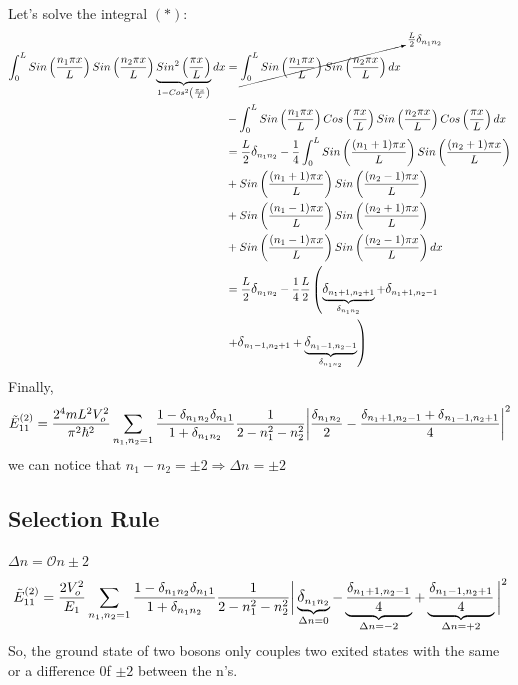 \documentclass[12pt,fancychapters]{report}
\numberwithin{equation}{section}
\begin{document}
Let's solve the integral $(*)$:
\begin{align*}
\int_{0}^{L} Sin\left(\frac{n_1 \pi x}{L}\right)
	Sin\left(\frac{n_2 \pi x}{L}\right)\underbrace{Sin^2\left(\frac{\pi x}{L}\right)}
	_{1-Cos^2\left(\frac{\pi x}{L}\right)}dx &= \cancelto{\frac{L}{2}\delta_{n_1n_2}}{\int_{0}^{L}
	Sin\left(\frac{n_1 \pi x}{L}\right)Sin\left(\frac{n_2 \pi x}{L}\right)dx}\\
	& -\int_{0}^{L}Sin\left(\frac{n_1 \pi x}{L}\right) Cos\left(\frac{\pi x}{L}\right)
	Sin\left(\frac{n_2 \pi x}{L}\right) Cos\left(\frac{\pi x}{L}\right)dx\\
	&= \frac{L}{2}\mathlarger{\delta}_{n_1n_2} -\frac{1}{4}\int_{0}^{L}Sin\left(\frac{(n_1+1)\pi x}
	{L}\right)Sin\left(\frac{(n_2+1)\pi x}{L}\right)\\
	& +Sin\left(\frac{(n_1+1)\pi x}{L}\right)Sin\left(\frac{(n_2-1)\pi x}{L}\right)\\
	&+ Sin\left(\frac{(n_1 -1)\pi x}{L}\right)Sin\left(\frac{(n_2+1)\pi x}{L}\right)\\
	&+ Sin\left(\frac{(n_1-1)\pi x}{L}\right)Sin\left(\frac{(n_2-1)\pi x}{L}\right)dx\\
	&= \frac{L}{2}\mathlarger{\delta}_{n_1n_2}-\frac{1}{4}\frac{L}{2}\left(\underbrace{\mathlarger
	{\delta}_{n_1+1,n_2+1}}_{\delta_{n_1n_2}} + \mathlarger{\delta}_{n_1+1,n_2-1}\right.\\
  & \left.+\mathlarger{\delta}
_{n_1-1,n_2+1}+\underbrace{\mathlarger{\delta}_{n_1-1,n_2-1}}_{\delta_{n_1n_2}}\right)\\
\end{align*}
Finally,
\begin{equation*}
	\tilde{E}_{11}^{(2)}=\frac{2^4 mL^2 V_o^2}{\pi^2 \hbar^2} \sum_{n_1,n_2 =1}\frac{1-\mathlarger{\delta}_{n_1 n_2}
	\mathlarger{\delta}_{n_1 1}}{1+\mathlarger{\delta}_{n_1 n_2}}\frac{1}{2-n_1^2-n_2^2}\bigg|
	\frac{\mathlarger{\delta}_{n_1n_2}}{2}-\frac{\mathlarger{\delta}_{n_1+1,n_2-1}+\mathlarger{\delta}
	_{n_1-1,n_2+1}}{4}\bigg|^2
\end{equation*}
we can notice that $n_1-n_2 = \pm 2\Rightarrow \Delta n = \pm 2$

\subsection*{Selection Rule}
$\Delta n = \mathcal{O}n \pm 2$
\begin{equation*}
		\tilde{E}_{11}^{(2)}=\frac{2V_o^2}{E_1} \sum_{n_1,n_2 =1}\frac{1-\mathlarger{\delta}_{n_1 n_2}
	\mathlarger{\delta}_{n_1 1}}{1+\mathlarger{\delta}_{n_1 n_2}}\frac{1}{2-n_1^2-n_2^2}\bigg|
	\underbrace{\mathlarger{\delta}_{n_1n_2}}_{\Delta n = 0}-
	\underbrace{\frac{\mathlarger{\delta}_{n_1+1,n_2-1}}{4}}_{\Delta n = -2}+
	\underbrace{\frac{\mathlarger{\delta}_{n_1-1,n_2+1}}{4}}_{\Delta n = +2}\bigg|^2
\end{equation*}
So, the ground state of two bosons only couples two exited states with the same or a difference
0f $\pm 2$ between the n's.
\end{document}
